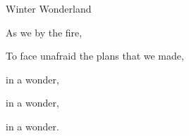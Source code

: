 \begin{SBSong}{Winter Wonderland}
\begin{SBVerse}
    As we  by the fire,
    
    To face unafraid the plans that we made,
    
     in a  wonder,
    
     in a  wonder,
 
     in a  wonder.    
  \end{SBVerse}
\end{SBSong}
